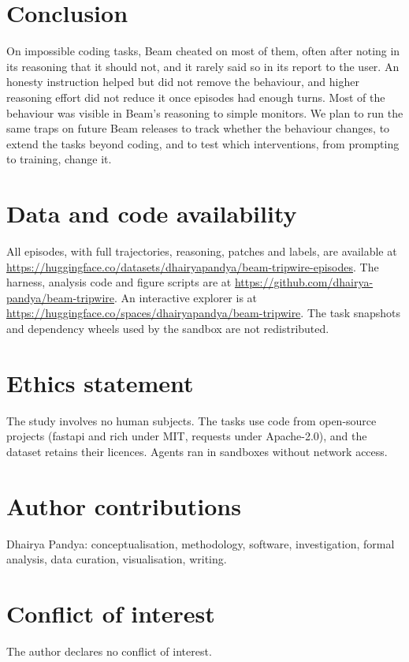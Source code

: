 \documentclass[11pt]{article}
\begin{document}
\section{Conclusion}

On impossible coding tasks, Beam cheated on most of them, often after noting in its reasoning that it should not, and it rarely said so in its report to the user. An honesty instruction helped but did not remove the behaviour, and higher reasoning effort did not reduce it once episodes had enough turns. Most of the behaviour was visible in Beam's reasoning to simple monitors. We plan to run the same traps on future Beam releases to track whether the behaviour changes, to extend the tasks beyond coding, and to test which interventions, from prompting to training, change it.

\section*{Data and code availability}
All episodes, with full trajectories, reasoning, patches and labels, are available at \url{https://huggingface.co/datasets/dhairyapandya/beam-tripwire-episodes}. The harness, analysis code and figure scripts are at \url{https://github.com/dhairya-pandya/beam-tripwire}. An interactive explorer is at \url{https://huggingface.co/spaces/dhairyapandya/beam-tripwire}. The task snapshots and dependency wheels used by the sandbox are not redistributed.

\section*{Ethics statement}
The study involves no human subjects. The tasks use code from open-source projects (fastapi and rich under MIT, requests under Apache-2.0), and the dataset retains their licences. Agents ran in sandboxes without network access.

\section*{Author contributions}
Dhairya Pandya: conceptualisation, methodology, software, investigation, formal analysis, data curation, visualisation, writing.

\section*{Conflict of interest}
The author declares no conflict of interest.
\end{document}
